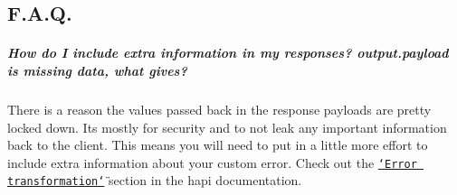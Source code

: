 \subsection*{F.\+A.\+Q.}

\subparagraph*{How do I include extra information in my responses? {\ttfamily output.\+payload} is missing {\ttfamily data}, what gives?}

There is a reason the values passed back in the response payloads are pretty locked down. It\textquotesingle{}s mostly for security and to not leak any important information back to the client. This means you will need to put in a little more effort to include extra information about your custom error. Check out the \href{https://github.com/hapijs/hapi/blob/master/API.md#error-transformation}{\tt \char`\"{}\+Error transformation\char`\"{}} section in the hapi documentation. 